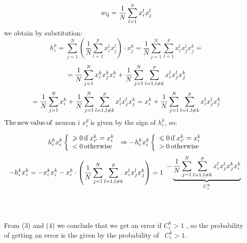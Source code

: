 \begin{equation}
  w_{\operatorname{ij}} = \frac{1}{N} \sum^p_{l = 1} x^l_{i^{}} x_j^l
\end{equation}
we obtain by substitution:
\[ h_i^k = \sum^N_{j = 1} \left(^{} \frac{1}{N} \sum^p_{l = 1} x^l_{i^{}}
   x^l_j \right)_{} \cdot x_j^k = \frac{1}{N}  \sum^N_{j = 1} \sum^p_{l = 1}
   x^l_{i^{}} x^l_j x^k_{^{} j} = \]
\[ = \frac{1}{N}  \sum^N_{j = 1} x^k_{i} x^k_j x^k_{^{j}} 
    + \frac{1}{N}  \sum^N_{j = 1} \sum^p_{l = 1 , l \neq k}
   x^l_{i^{}} x^l_j x^k_{^{} j} \]
\[ = \frac{1}{N}  \sum^N_{j = 1} x^k_{i} + \frac{1}{N}  \sum^N_{j = 1}
   \sum^p_{l = 1 , l \neq k} x^l_{i} x^l_{j} x^k_{j} = x^k_{i}
   + \frac{1}{N}  \sum^N_{j = 1} \sum^p_{l = 1 , l \neq k} x^l_{i}
   x^l_{j} x^k_{j} \]
\[  \]
$\operatorname{The} \operatorname{new} \operatorname{value} \operatorname{of}$ neuron i $x^{k'}_i $is given by
the sign of $h_i^k $, so:




\begin{equation}
  h^k_i x^k_i \left\{ \begin{array}{l}
    \geqslant 0    \operatorname{if} x^k_{i'} = x^k_i\\
    < 0 \operatorname{otherwise}
  \end{array} \right.^{}_{} \Rightarrow -_{} h^k_i x^k_i \left\{
  \begin{array}{l}
    \leqslant 0    \operatorname{if} x^k_{i'} = x^k_i\\
    > 0 \operatorname{otherwise}
  \end{array} \right.
\end{equation}
\begin{equation}
  - h^k_i x^k_{^{} i} = - x^k_{i^{}} x^k_{i^{}} - x^k_{i^{}} \cdot \left(
  \frac{1}{N}  \sum^N_{j = 1} \sum^p_{l = 1 , l \neq k} x^l_{i^{}}
  x^l_j x^k_{^{} j} \right) = 1 \begin{array}{c}
    - \underbrace{\frac{1}{N} \sum^N_{j = 1} \sum^p_{l = 1 , l \neq k}
    x^l_{i^{}} x^l_j x^k_{^{} j} x^k_i}_{C^k_i}
  \end{array}
\end{equation}
\ \ \ \ \ \ \ \ \ \ \ \ \ \ \ \ \ \ \ \ \ \ \ \ \ \ \ \ \ \ \ \ \ \ \ \ \ \ \
\ \ \ \ \ \ \ \ \ \ \ \ \ \ \ \ \ \ \ \ \ \ \ \ \ \ \ \ \ \ \ \ \ \ \ \ \ \ \
\ \ \ \ \ \ \ \ \ \ \ \ \ \ \ \ \ \

From (3) and (4) we conclude that we get an error if $C_i^k > 1$ , so the
probability of getting an error is the given by the probability of \ $C_i^k >
1$.

